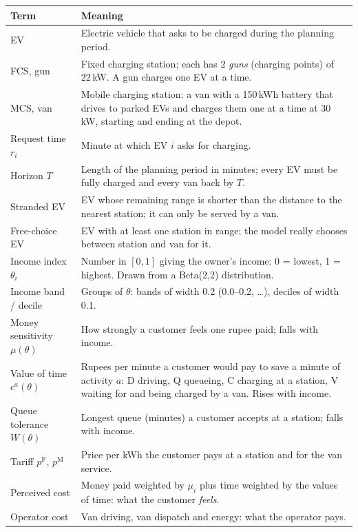 \documentclass[11pt,a4paper]{article}
\begin{document}
\begin{xltabular}{\textwidth}{@{}>{\raggedright\arraybackslash}p{4.0cm}X@{}}
\toprule
\textbf{Term} & \textbf{Meaning} \\
\midrule
\endhead
EV & Electric vehicle that asks to be charged during the planning period. \\
FCS, gun & Fixed charging station; each has 2 \emph{guns} (charging points) of 22\,kW. A gun charges one EV at a time. \\
MCS, van & Mobile charging station: a van with a 150\,kWh battery that drives to parked EVs and charges them one at a time at 30\,kW, starting and ending at the depot. \\
Request time $r_i$ & Minute at which EV $i$ asks for charging. \\
Horizon $T$ & Length of the planning period in minutes; every EV must be fully charged and every van back by $T$. \\
Stranded EV & EV whose remaining range is shorter than the distance to the nearest station; it can only be served by a van. \\
Free-choice EV & EV with at least one station in range; the model really chooses between station and van for it. \\
Income index $\theta_i$ & Number in $[0,1]$ giving the owner's income: 0 = lowest, 1 = highest. Drawn from a Beta(2,2) distribution. \\
Income band / decile & Groups of $\theta$: bands of width 0.2 (0.0--0.2, \dots), deciles of width 0.1. \\
Money sensitivity $\mu(\theta)$ & How strongly a customer feels one rupee paid; falls with income. \\
Value of time $c^{a}(\theta)$ & Rupees per minute a customer would pay to save a minute of activity $a$: D driving, Q queueing, C charging at a station, V waiting for and being charged by a van. Rises with income. \\
Queue tolerance $W(\theta)$ & Longest queue (minutes) a customer accepts at a station; falls with income. \\
Tariff $p^{\mathrm F}$, $p^{\mathrm M}$ & Price per kWh the customer pays at a station and for the van service. \\
Perceived cost & Money paid weighted by $\mu_i$ plus time weighted by the values of time: what the customer \emph{feels}. \\
Operator cost & Van driving, van dispatch and energy: what the operator pays. \\

\end{xltabular}
\end{document}
